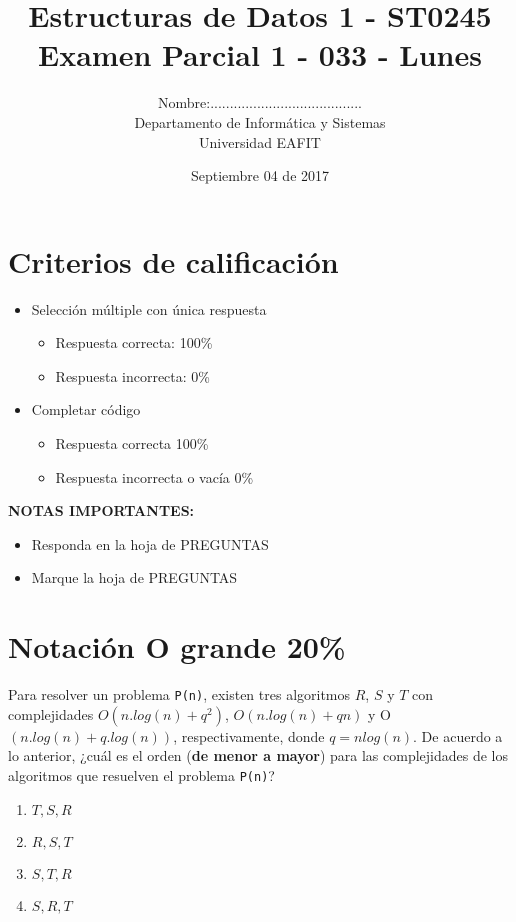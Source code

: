 \documentclass[twocolumn]{article}
\author{
Nombre:....................................... \\
    Departamento de Informática y Sistemas \\
    Universidad EAFIT \\
}
\title{
    Estructuras de Datos 1 - ST0245 \\
    Examen Parcial 1 - 033 - Lunes
}
\date{
    Septiembre 04 de 2017
}
\begin{document}
\vspace{-5cm}
\maketitle


\section*{Criterios de calificación}


\begin{itemize}
\item Selección múltiple con única respuesta
\begin{itemize}
\item Respuesta correcta: 100\%
\item Respuesta incorrecta: 0\%
\end{itemize}

\item Completar código
\begin{itemize}
\item Respuesta correcta 100\%
\item Respuesta incorrecta o vacía 0\%\\
\end{itemize}
\end{itemize}


\textbf{NOTAS IMPORTANTES:}
\begin{itemize}
	\item Responda en la hoja de PREGUNTAS
	\item Marque la hoja de PREGUNTAS
\end{itemize}


\section{Notación O grande 20\%}
Para resolver un problema \texttt{P(n)}, existen tres algoritmos $R$, $S$ y $T$  con complejidades     $O (n. log (n) + q^2)$, $O (n. log (n) + qn)$ y O $(n. log(n) + q. log(n))$, respectivamente, donde  $q = n log(n)$. De acuerdo a lo anterior, ¿cuál es el orden (\textbf{de menor a mayor}) para las complejidades de los algoritmos que resuelven el problema \texttt{P(n)}? \\

\begin{enumerate}[label=\Alph*.]
\item $T, S, R$
\item $R, S, T$
\item $S, T, R$
\item $S, R, T$
\end{enumerate}
\end{document}
